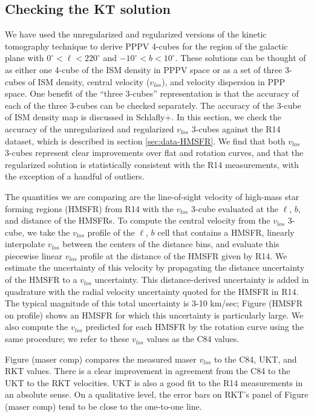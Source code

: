 \subsection{Checking the KT solution}
\label{sec:KT-validation}

We have used the unregularized and regularized versions of the kinetic tomography technique to derive PPPV 4-cubes for the region of the galactic plane with $0^\circ < \ell < 220^\circ$ and $-10^\circ < b < 10^\circ$. %
These solutions can be thought of as either one 4-cube of the ISM density in PPPV space or as a set of three 3-cubes of ISM density, central velocity ($v_{los}$), and velocity dispersion in PPP space. One benefit of the ``three 3-cubes'' representation is that the accuracy of each of the three 3-cubes can be checked separately. The accuracy of the 3-cube of ISM density map is discussed in Schlafly+. In this section, we check the accuracy of the unregularized and regularized $v_{los}$ 3-cubes against the R14 dataset, which is described in section \ref{sec:data-HMSFR}. We find that both $v_{los}$ 3-cubes represent clear improvements over flat and \cite{Clemens_1985} rotation curves, and that the regularized solution is statistically consistent with the R14 measurements, with the exception of a handful of outliers. 

The quantities we are comparing are the line-of-sight velocity of high-mass star forming regions (HMSFR) from R14 with the $v_{los}$ 3-cube evaluated at the $\ell$, $b$, and distance of the HMSFRs. To compute the central velocity from the $v_{los}$ 3-cube, we take the $v_{los}$ profile of the $\ell$, $b$ cell that contains a HMSFR, linearly interpolate $v_{los}$ between the centers of the distance bins, and evaluate this piecewise linear $v_{los}$ profile at the distance of the HMSFR given by R14. We estimate the uncertainty of this velocity by propagating the distance uncertainty of the HMSFR to a $v_{los}$ uncertainty. This distance-derived uncertainty is added in quadrature with the radial velocity uncertainty quoted for the HMSFR in R14. The typical magnitude of this total uncertainty is 3-10 km/sec; Figure (HMSFR on profile) shows an HMSFR for which this uncertainty is particularly large. We also compute the $v_{los}$ predicted for each HMSFR by the \citet{Clemens_1985} rotation curve using the same procedure; we refer to these $v_{los}$ values as the C84 values. 

Figure (maser comp) compares the measured maser $v_{los}$ to the C84, UKT, and  RKT values. There is a clear improvement in agreement from the C84 to the UKT to the RKT velocities. UKT is also a good fit to the R14 measurements in an absolute sense. On a qualitative level, the error bars on RKT's panel of Figure (maser comp) tend to be close to the one-to-one line. 


